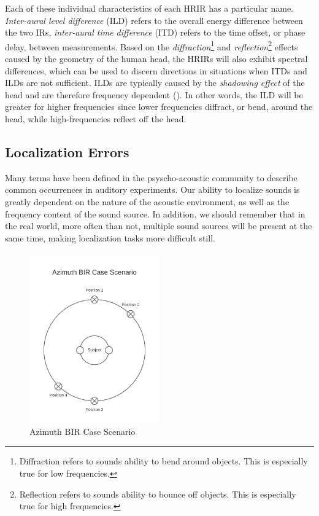 Each of these individual characteristics of each HRIR has a particular name. \textit{Inter-aural level difference} (ILD) refers to the overall energy difference between the two IRs, \textit{inter-aural time difference} (ITD) refers to the time offset, or phase delay, between measurements. Based on the \textit{diffraction}\footnote{Diffraction refers to sounds ability to bend around objects. This is especially true for low frequencies.} and \textit{reflection}\footnote{Reflection refers to sounds ability to bounce off objects. This is especially true for high frequencies.} effects caused by the geometry of the human head, the HRIRs will also exhibit spectral differences, which can be used to discern directions in situations when ITDs and ILDs are not sufficient. ILDs are typically caused by the \textit{shadowing effect} of the head and are therefore frequency dependent (\cite{cuevas20193d}). In other words, the ILD will be greater for higher frequencies since lower frequencies diffract, or bend, around the head, while high-frequencies reflect off the head. 

\subsection{Localization Errors}

Many terms have been defined in the psyscho-acoustic community to describe common occurrences in auditory experiments. Our ability to localize sounds is greatly dependent on the nature of the acoustic environment, as well as the frequency content of the sound source. In addition, we should remember that in the real world, more often than not, multiple sound sources will be present at the same time, making localization tasks more difficult still.

\begin{figure}[ht!]%
\centering
\includegraphics[width=0.5\textwidth]{img/azimuth-bir.png}
\caption{Azimuth BIR Case Scenario}
\label{fig:azimuth-bir}
\end{figure}

